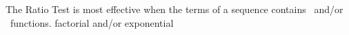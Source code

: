 {The Ratio Test is most effective when the terms of a sequence contains \underlinespace\ and/or \underlinespace\ functions.
}
{factorial and/or exponential
}
